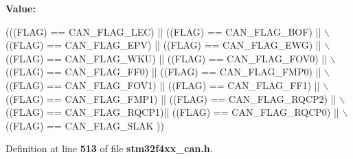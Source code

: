 {\bfseries Value\+:}
\begin{DoxyCode}
(((FLAG) == CAN_FLAG_LEC)  || ((FLAG) == CAN_FLAG_BOF)   || \(\backslash\)
                               ((FLAG) == CAN_FLAG_EPV)  || ((FLAG) == 
      CAN_FLAG_EWG)   || \(\backslash\)
                               ((FLAG) == CAN_FLAG_WKU)  || ((FLAG) == 
      CAN_FLAG_FOV0)  || \(\backslash\)
                               ((FLAG) == CAN_FLAG_FF0)  || ((FLAG) == 
      CAN_FLAG_FMP0)  || \(\backslash\)
                               ((FLAG) == CAN_FLAG_FOV1) || ((FLAG) == 
      CAN_FLAG_FF1)   || \(\backslash\)
                               ((FLAG) == CAN_FLAG_FMP1) || ((FLAG) == 
      CAN_FLAG_RQCP2) || \(\backslash\)
                               ((FLAG) == CAN_FLAG_RQCP1)|| ((FLAG) == 
      CAN_FLAG_RQCP0) || \(\backslash\)
                               ((FLAG) == CAN_FLAG_SLAK ))
\end{DoxyCode}


Definition at line \textbf{ 513} of file \textbf{ stm32f4xx\+\_\+can.\+h}.

